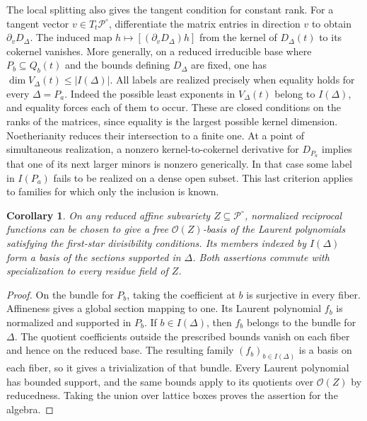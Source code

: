 \documentclass[11pt,reqno]{amsart}
\numberwithin{equation}{section}
\newtheorem{corollary}[theorem]{Corollary}
\theoremstyle{definition}
\theoremstyle{remark}
\begin{document}
The local splitting also gives the tangent condition for constant
rank. For a tangent vector \(v\in T_t\mathcal P^\circ\), differentiate
the matrix entries in direction \(v\) to obtain \(\partial_vD_\Delta\).
The induced map \(h\mapsto[(\partial_vD_\Delta)h]\) from the kernel
of \(D_\Delta(t)\) to its cokernel
vanishes. More generally,
on a reduced irreducible base where \(P_b\subseteq Q_b(t)\) and the
bounds defining \(D_\Delta\) are fixed, one has
\(\dim V_\Delta(t)\le |I(\Delta)|\). All labels are realized precisely
when equality holds for every \(\Delta=P_a\). Indeed the possible least
exponents in \(V_\Delta(t)\) belong to \(I(\Delta)\), and equality forces
each of them to occur. These are closed conditions on the ranks of the
matrices, since equality is the largest possible kernel dimension. Noetherianity reduces their intersection to a finite one.
At a point of simultaneous realization, a nonzero kernel-to-cokernel
derivative for \(D_{P_a}\) implies that one of its next larger minors
is nonzero generically. In that case some label in \(I(P_a)\) fails to
be realized on a dense open subset. This last criterion applies to
families for which only the inclusion is known.

\begin{corollary}\label{cor:relative-reciprocal-basis}
On any reduced affine subvariety \(Z\subseteq \mathcal P^\circ\), normalized
reciprocal functions can be chosen to give a free
\(\mathcal O(Z)\)-basis of the Laurent polynomials satisfying the
first-star divisibility conditions. Its members indexed by \(I(\Delta)\)
form a basis of the sections supported in \(\Delta\). Both assertions
commute with specialization to every residue field of \(Z\).
\end{corollary}
\begin{proof}
On the bundle for \(P_b\), taking the coefficient at \(b\) is
surjective in every fiber. Affineness gives a global section mapping
to one. Its Laurent polynomial \(f_b\) is normalized and supported in
\(P_b\). If \(b\in I(\Delta)\), then \(f_b\) belongs to the bundle for
\(\Delta\). The quotient coefficients outside the prescribed bounds vanish
on each fiber and hence on the reduced base. The resulting family
\((f_b)_{b\in I(\Delta)}\) is a basis on each fiber, so it gives a
trivialization of that bundle. Every Laurent polynomial has bounded
support, and the same bounds apply to its quotients over \(\mathcal O(Z)\)
by reducedness. Taking the union over lattice boxes proves the assertion
for the algebra.
\end{proof}
\end{document}
